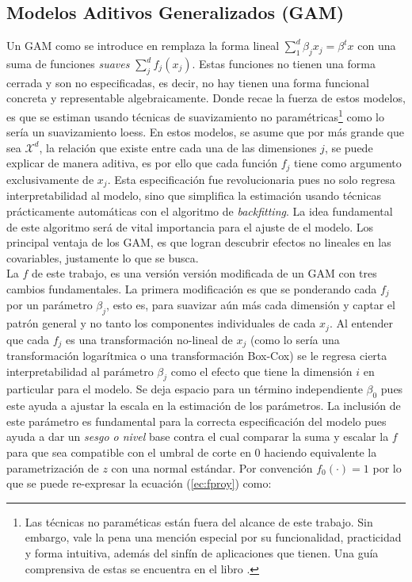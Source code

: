 \documentclass[../Main/Main.tex]{subfiles}
\begin{document}
\subsection{Modelos Aditivos Generalizados (GAM)} \label{sec:GAM}
Un GAM como se introduce en \autocite{hastie1986generalized} remplaza la forma lineal $\sum_{1}^d\beta_jx_j = \beta^tx$ con una suma de funciones \textit{suaves} $\sum_j^d f_j(x_j)$. Estas funciones no tienen una forma cerrada y son no especificadas, es decir, no hay tienen una forma funcional concreta y representable algebraicamente. Donde recae la fuerza de estos modelos, es que se estiman usando técnicas de suavizamiento no paramétricas\footnote{Las técnicas no paraméticas están fuera del alcance de este trabajo. Sin embargo, vale la pena una mención especial por su funcionalidad, practicidad y forma intuitiva, además del sinfín de aplicaciones que tienen. Una guía comprensiva de estas se encuentra en el libro \autocite{wasserman2007all}.} como lo sería un suavizamiento loess. En estos modelos, se asume que por más grande que sea $\mathcal{X}^d$, la relación que existe entre cada una de las dimensiones $j$, se puede explicar de manera aditiva, es por ello que cada función $f_j$ tiene como argumento exclusivamente de $x_j$. Esta especificación fue revolucionaria pues no solo regresa interpretabilidad al modelo, sino que simplifica la estimación usando técnicas prácticamente automáticas con el algoritmo de \textit{backfitting}. La idea fundamental de este algoritmo será de vital importancia para el ajuste de el modelo. Los principal ventaja de los GAM, es que logran descubrir efectos no lineales en las covariables, justamente lo que se busca. \\

La $f$ de este trabajo, es una versión versión modificada de un GAM con tres cambios fundamentales. La primera modificación es que se ponderando cada $f_j$ por un parámetro $\beta_j$, esto es, para suavizar aún más cada dimensión y captar el patrón general y no tanto los componentes individuales de cada $x_j$. Al entender que cada $f_j$ es una transformación no-lineal de $x_j$ (como lo sería una transformación logarítmica o una transformación Box-Cox) se le regresa cierta interpretabilidad al parámetro $\beta_j$ como el efecto que tiene la dimensión $i$ en particular para el modelo. Se deja espacio para un término independiente $\beta_0$ pues este ayuda a ajustar la escala en la estimación de los parámetros. La inclusión de este parámetro es fundamental para la correcta especificación del modelo pues ayuda a dar un \textit{sesgo o nivel} base contra el cual comparar la suma y escalar la $f$ para que sea compatible con el umbral de corte en $0$ haciendo equivalente la parametrización de $z$ con una normal estándar. Por convención $f_0(\cdot) = 1$ por lo que se puede re-expresar la ecuación (\ref{ec:fproy}) como:
\end{document}

